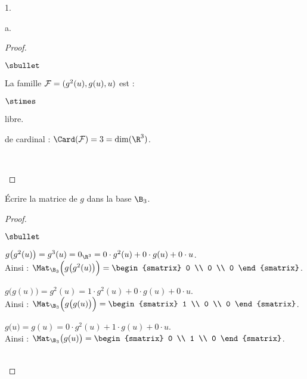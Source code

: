 \documentclass[11pt]{article}%
\begin{document}
\begin{noliste}{1.}
\begin{noliste}{a.}
\begin{proof}
\begin{noliste}{$\sbullet$}
        \newpage


      \item La famille ${\cal F} = (g^{2}(u), g(u), u)$ est :
        \begin{noliste}{$\stimes$}
        \item libre.
        \item de cardinal : $\Card({\cal F}) = 3 = \dim(\R^3)$.
        \end{noliste}
        ~\\[-1.6cm]
      \end{noliste}
    \end{proof}

  \item Écrire la matrice de $g$ dans la base $\B_3$.

    \begin{proof}~%
      \begin{noliste}{$\sbullet$}
      \item $g\big( g^2(u) \big) = g^3(u) = 0_{\R^3} = 0 \cdot g^2(u)
        + 0 \cdot g(u) + 0 \cdot u$.\\[.1cm] 
        Ainsi : $\Mat_{\B_3}\Big( g\big( g^2(u) \big) \Big) =
        \begin{smatrix}
          0 \\
          0 \\
          0
        \end{smatrix}
        $.

      \item $g\big( g(u) \big) = g^2(u) = 1 \cdot g^2(u) + 0 \cdot
        g(u) + 0 \cdot u$.\\[.1cm] 
        Ainsi : $\Mat_{\B_3}\Big( g\big( g(u) \big) \Big) =
        \begin{smatrix}
          1 \\
          0 \\
          0
        \end{smatrix}
        $.

      \item $g\big( u \big) = g(u) = 0 \cdot g^2(u) + 1 \cdot g(u) + 0
        \cdot u$.\\[.1cm] 
        Ainsi : $\Mat_{\B_3}\big( g(u) \big) =
        \begin{smatrix}
          0 \\
          1 \\
          0
        \end{smatrix}
        $.
      \end{noliste}
      ~\\[-1.2cm]
    \end{proof}


\end{noliste}
\end{noliste}
\end{document}
